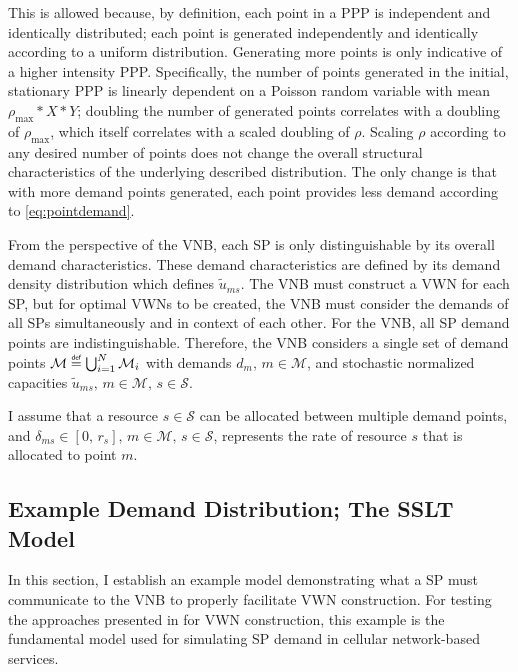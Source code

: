 \documentclass[12pt,dvipsnames]{report}
\newcommand\defeq{\mathrel{\overset{\makebox[0pt]{\mbox{\normalfont\tiny\sffamily def}}}{=}}}
\begin{document}
This is allowed because, by definition, each point in a PPP is independent and identically distributed; each point is generated independently and identically according to a uniform distribution.  Generating more points is only indicative of a higher intensity PPP.  Specifically, the number of points generated in the initial, stationary PPP is linearly dependent on a Poisson random variable with mean $\rho_{\max} * X * Y$; doubling the number of generated points correlates with a doubling of $\rho_{\max}$, which itself correlates with a scaled doubling of $\rho$.  Scaling $\rho$ according to any desired number of points does not change the overall structural characteristics of the underlying described distribution.  The only change is that with more demand points generated, each point provides less demand according to \cref{eq:pointdemand}.

From the perspective of the VNB, each SP is only distinguishable by its overall demand characteristics.  These demand characteristics are defined by its demand density distribution which defines $\tilde{u}_{ms}$.  The VNB must construct a VWN for each SP, but for optimal VWNs to be created, the VNB must consider the demands of all SPs simultaneously and in context of each other.  For the VNB, all SP demand points are indistinguishable.  Therefore, the VNB considers a single set of demand points $\mathcal{M} \defeq \bigcup_{i=1}^{N} \mathcal{M}_i$ with demands $d_m,\, m \in \mathcal{M}$, and stochastic normalized capacities $\tilde{u}_{ms},\, m \in \mathcal{M},\, s \in \mathcal{S}$.

I assume that a resource $s \in \mathcal{S}$ can be allocated between multiple demand points, and $\delta_{ms} \in [0,\, r_s],\, m \in \mathcal{M},\, s \in \mathcal{S}$, represents the rate of resource $s$ that is allocated to point $m$.

\subsection{Example Demand Distribution; The SSLT Model} \label{subsec:networkdefs_sslt}

In this section, I establish an example model demonstrating what a SP must communicate to the VNB to properly facilitate VWN construction.  For testing the approaches presented in  for VWN construction, this example is the fundamental model used for simulating SP demand in cellular network-based services.
\end{document}
